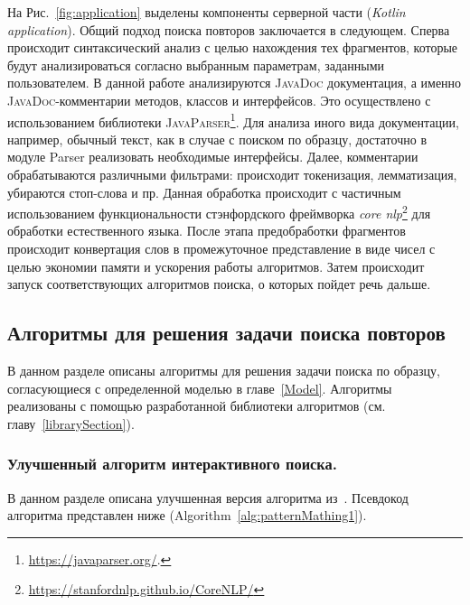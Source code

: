 На Рис.~\ref{fig:application} выделены компоненты серверной части (\emph{Kotlin application}).
Общий подход поиска повторов заключается в следующем.
Сперва происходит синтаксический анализ с целью нахождения тех фрагментов, которые будут анализироваться согласно выбранным параметрам, заданными пользователем.
В данной работе анализируются \textsc{JavaDoc} документация, а именно \textsc{JavaDoc}-комментарии методов, классов и интерфейсов.
Это осуществлено с использованием библиотеки \textsc{JavaParser}\footnote{\url{https://javaparser.org/}.}.
Для анализа иного вида документации, например, обычный текст, как в случае с поиском по образцу, достаточно в модуле Parser реализовать необходимые интерфейсы.
Далее, комментарии обрабатываются различными фильтрами: происходит токенизация, лемматизация, убираются стоп-слова и пр.
 Данная обработка происходит с частичным использованием функциональности стэнфордского фреймворка \emph{core nlp}\footnote{\url{https://stanfordnlp.github.io/CoreNLP/}} для обработки естественного языка.
После этапа предобработки фрагментов происходит конвертация слов в промежуточное представление в виде чисел с целью экономии памяти и ускорения работы алгоритмов.
Затем происходит запуск соответствующих алгоритмов поиска, о которых пойдет речь дальше.


\subsection{Алгоритмы для решения задачи поиска повторов}\label{fics}

В данном разделе описаны алгоритмы для решения задачи поиска по образцу,  согласующиеся с определенной моделью в главе~\ref{Model}.
Алгоритмы реализованы с помощью разработанной библиотеки алгоритмов (см. главу~\ref{librarySection}).

\subsubsection{Улучшенный алгоритм интерактивного поиска.}
В данном разделе описана улучшенная версия алгоритма из~\cite{luciv2019interactive}.
Псевдокод алгоритма представлен ниже (Algorithm~\ref{alg:patternMathing1}).

